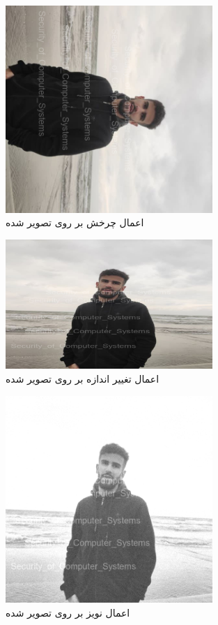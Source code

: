 \begin{figure}[H]
  \centering
  \includegraphics[width=0.7\textwidth]{Images/rotated.png}
  \caption{اعمال چرخش بر روی تصویر  شده}   
\end{figure}
\begin{figure}[H]
  \centering
  \includegraphics[width=0.7\textwidth]{Images/resized.png}
  \caption{اعمال تغییر اندازه بر روی تصویر  شده}   
\end{figure}
\begin{figure}[H]
  \centering
  \includegraphics[width=0.7\textwidth]{Images/noisy.png}
  \caption{اعمال نویز بر روی تصویر  شده}   
\end{figure}
